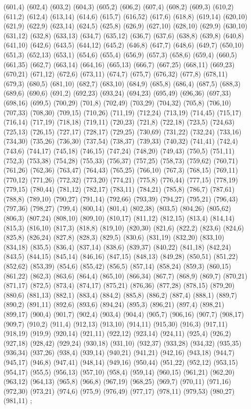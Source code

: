 {(601,4)
(602,4)
(603,2)
(604,3)
(605,2)
(606,2)
(607,4)
(608,2)
(609,3)
(610,2)
(611,2)
(612,4)
(613,14)
(614,6)
(615,7)
(616,52)
(617,6)
(618,8)
(619,14)
(620,10)
(621,9)
(622,9)
(623,14)
(624,5)
(625,8)
(626,9)
(627,10)
(628,10)
(629,9)
(630,10)
(631,12)
(632,8)
(633,13)
(634,7)
(635,12)
(636,7)
(637,6)
(638,8)
(639,8)
(640,8)
(641,10)
(642,6)
(643,5)
(644,12)
(645,2)
(646,8)
(647,7)
(648,6)
(649,7)
(650,10)
(651,3)
(652,13)
(653,1)
(654,6)
(655,4)
(656,9)
(657,3)
(658,6)
(659,4)
(660,5)
(661,35)
(662,7)
(663,14)
(664,16)
(665,13)
(666,7)
(667,25)
(668,11)
(669,23)
(670,21)
(671,12)
(672,6)
(673,11)
(674,7)
(675,7)
(676,32)
(677,8)
(678,11)
(679,3)
(680,5)
(681,10)
(682,7)
(683,10)
(684,9)
(685,8)
(686,4)
(687,5)
(688,3)
(689,6)
(690,6)
(691,2)
(692,23)
(693,24)
(694,23)
(695,49)
(696,36)
(697,33)
(698,16)
(699,5)
(700,29)
(701,8)
(702,49)
(703,29)
(704,32)
(705,8)
(706,10)
(707,33)
(708,30)
(709,15)
(710,26)
(711,19)
(712,24)
(713,19)
(714,45)
(715,17)
(716,14)
(717,19)
(718,18)
(719,11)
(720,23)
(721,8)
(722,18)
(723,5)
(724,63)
(725,13)
(726,15)
(727,17)
(728,17)
(729,25)
(730,69)
(731,22)
(732,24)
(733,16)
(734,30)
(735,26)
(736,30)
(737,54)
(738,37)
(739,33)
(740,32)
(741,41)
(742,4)
(743,6)
(744,17)
(745,18)
(746,15)
(747,24)
(748,20)
(749,43)
(750,5)
(751,11)
(752,3)
(753,38)
(754,28)
(755,33)
(756,37)
(757,25)
(758,73)
(759,62)
(760,71)
(761,26)
(762,36)
(763,47)
(764,43)
(765,25)
(766,10)
(767,3)
(768,15)
(769,11)
(770,12)
(771,26)
(772,32)
(773,20)
(774,21)
(775,8)
(776,44)
(777,15)
(778,19)
(779,15)
(780,44)
(781,12)
(782,17)
(783,11)
(784,21)
(785,8)
(786,7)
(787,61)
(788,8)
(789,10)
(790,27)
(791,14)
(792,66)
(793,39)
(794,27)
(795,21)
(796,43)
(797,36)
(798,27)
(799,4)
(800,14)
(801,4)
(802,38)
(803,5)
(804,26)
(805,62)
(806,3)
(807,24)
(808,10)
(809,10)
(810,17)
(811,12)
(812,15)
(813,4)
(814,14)
(815,3)
(816,10)
(817,3)
(818,8)
(819,10)
(820,30)
(821,6)
(822,2)
(823,6)
(824,6)
(825,8)
(826,24)
(827,8)
(828,3)
(829,5)
(830,6)
(831,19)
(832,20)
(833,10)
(834,18)
(835,5)
(836,4)
(837,14)
(838,6)
(839,37)
(840,22)
(841,18)
(842,24)
(843,5)
(844,15)
(845,14)
(846,16)
(847,15)
(848,13)
(849,28)
(850,51)
(851,22)
(852,62)
(853,39)
(854,6)
(855,42)
(856,5)
(857,14)
(858,24)
(859,3)
(860,15)
(861,22)
(862,3)
(863,6)
(864,4)
(865,10)
(866,34)
(867,7)
(868,9)
(869,7)
(870,21)
(871,17)
(872,5)
(873,4)
(874,17)
(875,21)
(876,36)
(877,28)
(878,15)
(879,20)
(880,6)
(881,13)
(882,1)
(883,4)
(884,2)
(885,8)
(886,2)
(887,4)
(888,1)
(889,7)
(890,2)
(891,11)
(892,6)
(893,6)
(894,24)
(895,3)
(896,21)
(897,4)
(898,21)
(899,17)
(900,4)
(901,7)
(902,4)
(903,4)
(904,4)
(905,7)
(906,16)
(907,7)
(908,17)
(909,7)
(910,2)
(911,4)
(912,13)
(913,10)
(914,11)
(915,30)
(916,3)
(917,11)
(918,19)
(919,9)
(920,14)
(921,11)
(922,12)
(923,14)
(924,11)
(925,4)
(926,2)
(927,18)
(928,42)
(929,24)
(930,18)
(931,10)
(932,37)
(933,28)
(934,32)
(935,35)
(936,34)
(937,26)
(938,4)
(939,14)
(940,21)
(941,21)
(942,16)
(943,18)
(944,7)
(945,17)
(946,8)
(947,41)
(948,14)
(949,16)
(950,44)
(951,22)
(952,12)
(953,15)
(954,17)
(955,5)
(956,13)
(957,10)
(958,4)
(959,14)
(960,15)
(961,21)
(962,20)
(963,12)
(964,13)
(965,8)
(966,8)
(967,19)
(968,25)
(969,7)
(970,11)
(971,16)
(972,30)
(973,21)
(974,6)
(975,9)
(976,49)
(977,17)
(978,11)
(979,53)
(980,27)
(981,11)
};
